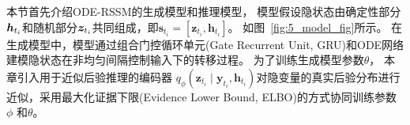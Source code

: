 本节首先介绍ODE-RSSM的生成模型和推理模型，
模型假设隐状态由确定性部分$\boldsymbol{h}_{t_i}$和随机部分$\boldsymbol{z}_{t_i}$共同组成，即$\boldsymbol{s}_{t_{i}}=[\boldsymbol{z}_{t_{i}},\boldsymbol{h}_{t_{i}}]$。
如图~\ref{fig:5_model_fig}所示。
在生成模型中，模型通过组合门控循环单元(Gate Recurrent Unit, GRU)和ODE网络建模隐状态在非均匀间隔控制输入下的转移过程。
为了训练生成模型参数$\theta$， 本章引入用于近似后验推理的编码器 $q_{\phi}\left(\boldsymbol{z}_{t_i} \mid \boldsymbol{y}_{t_i}, \boldsymbol{h}_{t_i}\right)$对隐变量的真实后验分布进行近似，采用最大化证据下限(Evidence Lower Bound, ELBO)的方式协同训练参数 $\phi$ 和$\theta$。





